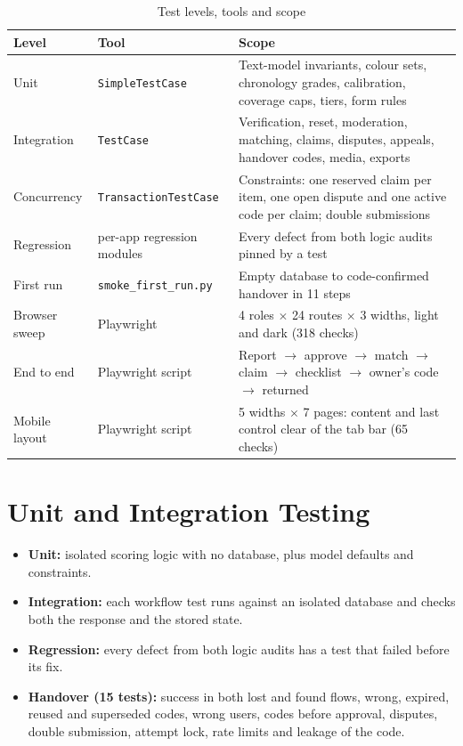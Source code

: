\documentclass[12pt,a4paper,oneside]{report}
\newcommand{\code}[1]{\texttt{#1}}
\begin{document}
\begin{table}[H]
\centering\small
\caption{Test levels, tools and scope}
\begin{tabularx}{\textwidth}{P{26mm}P{38mm}X}
\toprule
Level & Tool & Scope\\
\midrule
Unit & \code{SimpleTestCase} & Text-model invariants, colour sets, chronology grades, calibration, coverage caps, tiers, form rules\\
Integration & \code{TestCase} & Verification, reset, moderation, matching, claims, disputes, appeals, handover codes, media, exports\\
Concurrency & \code{TransactionTestCase} & Constraints: one reserved claim per item, one open dispute and one active code per claim; double submissions\\
Regression & per-app regression modules & Every defect from both logic audits pinned by a test\\
First run & \code{smoke\_first\_run.py} & Empty database to code-confirmed handover in 11 steps\\
Browser sweep & Playwright \cite{playwright} & 4 roles $\times$ 24 routes $\times$ 3 widths, light and dark (318 checks)\\
End to end & Playwright script & Report $\rightarrow$ approve $\rightarrow$ match $\rightarrow$ claim $\rightarrow$ checklist $\rightarrow$ owner's code $\rightarrow$ returned\\
Mobile layout & Playwright script & 5 widths $\times$ 7 pages: content and last control clear of the tab bar (65 checks)\\
\bottomrule
\end{tabularx}
\end{table}

\section{Unit and Integration Testing}
\begin{itemize}
  \item \textbf{Unit:} isolated scoring logic with no database, plus model defaults and constraints.
  \item \textbf{Integration:} each workflow test runs against an isolated database and checks both the response and the stored state.
  \item \textbf{Regression:} every defect from both logic audits has a test that failed before its fix.
  \item \textbf{Handover (15 tests):} success in both lost and found flows, wrong, expired, reused and superseded codes, wrong users, codes before approval, disputes, double submission, attempt lock, rate limits and leakage of the code.
\end{itemize}
\end{document}
